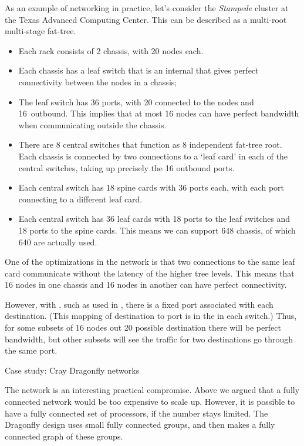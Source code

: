 As an example of networking in practice, let's consider the
\emph{Stampede} cluster at the Texas
Advanced Computing Center. This can be described as a multi-root
multi-stage fat-tree.
\begin{itemize}
\item Each rack consists of 2 chassis, with 20 nodes each.
\item Each chassis has a leaf switch that is an internal
   that gives perfect connectivity between the
  nodes in a chassis;
\item The leaf switch has 36 ports, with 20 connected to the nodes and
  16~outbound. This  implies that at most
  16 nodes can have perfect bandwidth when communicating outside the
  chassis.
\item There are 8 central switches that function as 8 independent
  fat-tree root. Each chassis is connected by two connections to a
  `leaf card' in each
  of the central switches, taking up precisely the 16 outbound ports.
\item Each central switch has 18 spine cards with 36 ports each, with
  each port connecting to a different leaf card.
\item Each central switch has 36 leaf cards with 18 ports to the leaf switches
  and 18 ports to the spine cards. This means we can support 648
  chassis, of which 640 are actually used.
\end{itemize}
One of the optimizations in the network is that two connections to the
same leaf card communicate without the latency of the higher tree levels.
This means that 16 nodes in one chassis and 16 nodes in another can
have perfect connectivity.

However, with
, such as used in ,
there is a fixed port associated with each destination. (This mapping
of destination to port is in the  in
each switch.) Thus, for some subsets of 16 nodes out 20 possible
destination there will be perfect bandwidth, but other subsets will
see the traffic for two destinations go through the same port.

 {Case study: Cray Dragonfly networks}

%
The  network
is an interesting practical compromise. Above we argued that a fully
connected network would be too expensive to scale up. However, it is possible to
have a fully connected set of processors, if the number stays
limited.  The Dragonfly design uses small fully connected groups, and
then makes a fully connected graph of these groups.

